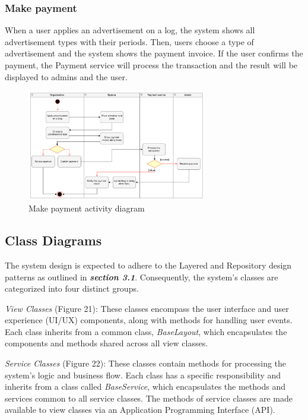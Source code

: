 \subsubsection{Make payment}

When a user applies an advertisement on a log, the system shows all advertisement types with their periods. Then, users choose a type of advertisement and the system shows the payment invoice. If the user confirms the payment, the Payment service will process the transaction and the result will be displayed to admins and the user.

\begin {figure}[H]
\centering
\includegraphics[width=0.7\textwidth]{Figures/payment.png}
\caption{Make payment activity diagram}
\label{fig:make-payment}
\end{figure}

\subsection{Class Diagrams}

The system design is expected to adhere to the Layered and Repository
design patterns as outlined in \emph{\textbf{section 3.1}}.
Consequently, the system's classes are categorized into four distinct
groups.

\emph{View Classes} (Figure 21): These classes encompass the user
interface and user experience (UI/UX) components, along with methods for
handling user events. Each class inherits from a common class,
\emph{BaseLayout}, which encapsulates the components and methods shared
across all view classes.

\emph{Service Classes} (Figure 22): These classes contain methods for
processing the system's logic and business flow. Each class has a
specific responsibility and inherits from a class called
\emph{BaseService}, which encapsulates the methods and services common
to all service classes. The methods of service classes are made
available to view classes via an Application Programming Interface
(API).

